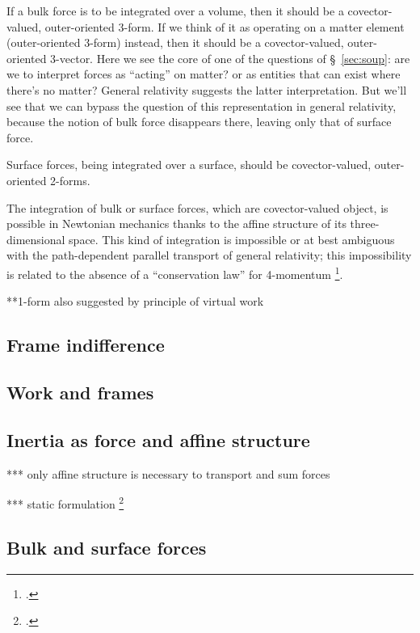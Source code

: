 \documentclass[\ifafour a4paper,12pt,\else a5paper,10pt,\fi%
onecolumn,oneside,article,%
british%
]{memoir}
\theoremstyle{remark}
\theoremstyle{innote}
\newcommand*{\citep}{\footcites}%
\renewcommand*{\|}{\nonscript\,\vert\nonscript\;\mathopen{}}
\newcommand*{\sect}{\S}%
\newcommand*{\cf}{{cf.}}
\begin{document}
If a bulk force is to be integrated over a volume, then it should be a
covector-valued, outer-oriented 3-form. If we think of it as operating on a
matter element (outer-oriented 3-form) instead, then it should be a
covector-valued, outer-oriented 3-vector. Here we see the core of one of
the questions of \sect~\ref{sec:soup}: are we to interpret forces as
\enquote{acting} on matter? or as entities that can exist where there's no
matter? General relativity suggests the latter interpretation. But we'll
see that we can bypass the question of this representation in general
relativity, because the notion of bulk force disappears there, leaving only
that of surface force.

Surface forces, being integrated over a surface, should be covector-valued,
outer-oriented 2-forms.

The integration of bulk or surface forces, which are covector-valued
object, is possible in Newtonian mechanics thanks to the affine structure of
its three-dimensional space. This kind of integration is impossible or
at best ambiguous with the path-dependent parallel transport of general
relativity; this impossibility is related to the absence of a
\enquote{conservation law} for 4-momentum \citep[\sect~21]{pauli1921_t1958}[\sect~59]{eddington1923_r1930}[\sect~96]{landauetal1939_t1994}[also][]{aldermanetal1970}.


**1-form also suggested by principle of virtual work

\subsection{Frame indifference}
\label{sec:frame_indifference}


\subsection{Work and frames}
\label{sec:work_frames}


\subsection{Inertia as force and affine structure}
\label{sec:inertia_is_force}

*** only affine structure is necessary to transport and sum forces

*** static formulation  \citep[\cf][\sect~6, p.~652]{vandantzig1934d}

\subsection{Bulk and surface forces}
\label{sec:surface_forces}
\end{document}
